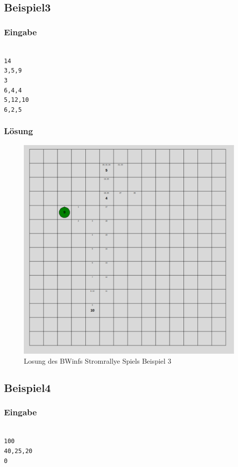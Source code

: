\documentclass[a4paper,12pt,arial]{scrartcl}
\begin{document}
\subsection{Beispiel3}
\subsubsection{Eingabe}
\texttt{ \\
14 \\
3,5,9 \\
3 \\
6,4,4 \\
5,12,10 \\
6,2,5 \\
}
\subsubsection{Lösung}
\begin{figure}[h]
    \centering
    \includegraphics[width=\textwidth]{solution3.pdf}
    \caption{Losung des BWinfs Stromrallye Spiels Beispiel 3}
    \label{fig:loesung3}
\end{figure}

\subsection{Beispiel4}
\subsubsection{Eingabe}
\texttt{ \\
100 \\
40,25,20 \\
0 \\
}
\end{document}
